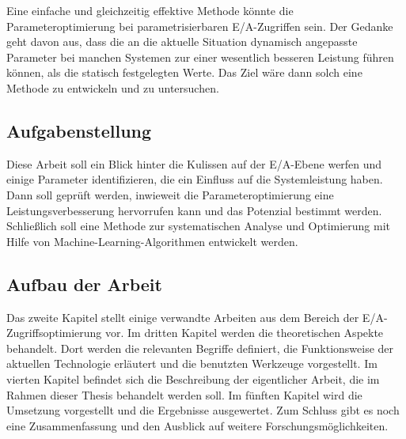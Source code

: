 Eine einfache und gleichzeitig effektive Methode könnte die Parameteroptimierung bei parametrisierbaren E/A-Zugriffen sein. Der Gedanke geht davon aus, dass die an die aktuelle Situation dynamisch angepasste Parameter bei manchen Systemen zur einer wesentlich besseren Leistung führen können, als die statisch festgelegten Werte. Das Ziel wäre dann solch eine Methode zu entwickeln und zu untersuchen.


\subsection{Aufgabenstellung}
Diese Arbeit soll ein Blick hinter die Kulissen auf der E/A-Ebene werfen und einige Parameter identifizieren, die ein Einfluss auf die Systemleistung haben. Dann soll geprüft werden, inwieweit die Parameteroptimierung eine Leistungsverbesserung hervorrufen kann und das Potenzial bestimmt werden. Schließlich soll eine Methode zur systematischen Analyse und Optimierung mit Hilfe von Machine-Learning-Algorithmen entwickelt werden. 


\subsection{Aufbau der Arbeit}
Das zweite Kapitel stellt einige verwandte Arbeiten aus dem Bereich der E/A-Zugriffsoptimierung vor. Im dritten Kapitel werden die theoretischen Aspekte behandelt. Dort werden die relevanten Begriffe definiert, die Funktionsweise der aktuellen Technologie erläutert und die benutzten Werkzeuge vorgestellt. Im vierten Kapitel befindet sich die Beschreibung der eigentlicher Arbeit, die im Rahmen dieser Thesis behandelt werden soll. Im fünften Kapitel wird die Umsetzung vorgestellt und die Ergebnisse ausgewertet. Zum Schluss gibt es noch eine Zusammenfassung und den Ausblick auf weitere Forschungsmöglichkeiten.
